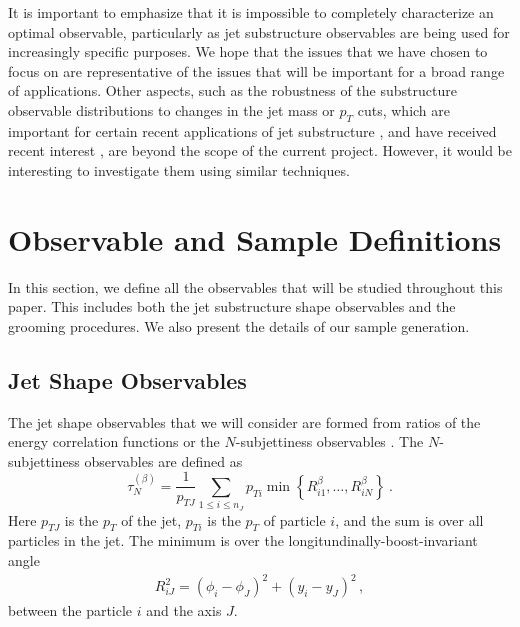 \documentclass[11pt,letterpaper]{article}
\begin{document}
It is important to emphasize that it is impossible to completely
characterize an optimal observable, particularly as jet substructure
observables are being used for increasingly specific
purposes.
%
We hope that the issues that we have chosen to focus on
are representative of the issues that will be important for a broad
range of applications.
%
Other aspects, such as the robustness of the substructure observable distributions to changes in the jet mass or $p_T$ cuts, which are important for certain recent applications of jet substructure \cite{Sirunyan:2017dgc,CMS-PAS-HIG-17-010,CMS-PAS-EXO-17-001,Sirunyan:2017dnz,Sirunyan:2017nvi,Aaboud:2018zba}, and have received recent interest \cite{Shimmin:2017mfk,Aguilar-Saavedra:2017rzt,Moult:2017okx}, are
beyond the scope of the current project.
However, it would be interesting to investigate them
using similar techniques.




\section{Observable and Sample Definitions}\label{jetsub_2prong_sec:obs_def}

In this section, we define all the observables that will be studied throughout this paper.
%
This includes both the jet substructure shape observables and the grooming procedures.  We also present the details of our sample generation.




\subsection{Jet Shape Observables}\label{jetsub_2prong_sec:shape_def}

The jet shape observables that we will consider are formed from ratios of the energy correlation functions \cite{Larkoski:2013eya,Moult:2016cvt} or the $N$-subjettiness observables \cite{Thaler:2010tr,Thaler:2011gf}.
%
The $N$-subjettiness observables are defined as \cite{Stewart:2010tn,Thaler:2010tr,Thaler:2011gf}
%
\begin{equation}\label{jetsub_2prong_eq:nsubdef}
\tau_{N}^{(\beta)} = \frac{1}{p_{TJ}}\sum_{1\leq i \leq n_J} p_{Ti}\min\left\{
R_{i1}^\beta,\dotsc,R_{iN}^\beta
\right\} \ .
\end{equation}
%
Here $p_{TJ}$ is the $p_T$ of the jet, $p_{Ti}$ is the $p_T$ of particle $i$, and the sum is over all particles in the jet.
%
The minimum is over the longitundinally-boost-invariant angle
%
\begin{align}
R_{iJ}^2 = (\phi_i-\phi_J)^2+(y_i-y_J)^2\,,
\end{align}
%
between the particle $i$ and the axis $J$.
\end{document}
